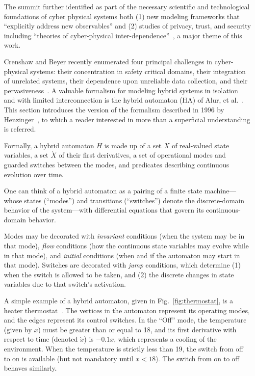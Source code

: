 The summit further identified as part of the necessary scientific and technological foundations of
cyber physical systems both (1) new modeling frameworks that ``explicitly address new observables'' and (2)
studies of privacy, trust, and security including ``theories of cyber-physical inter-dependence''~\cite{summitreport2008},
a major theme of this work.

Crenshaw and Beyer recently enumerated four principal challenges in 
cyber-physical systems:
their concentration in safety critical domains, their integration of 
unrelated systems, their dependence upon unreliable 
data collection, and their pervasiveness~\cite{crenshaw2010upbot}.
A valuable formalism for modeling hybrid systems in isolation and with limited 
interconnection is the hybrid automaton (HA) of Alur, et al.~\cite{alur1993hybrid}. 
This section introduces the version of the formalism described in 1996 by 
Henzinger~\cite{henzinger1996theory}, to which a reader interested in more 
than a superficial understanding is referred. 

Formally,
a hybrid automaton $H$ is made up of a set $X$ of real-valued state variables, 
a set $\dot{X}$ of their first derivatives, a set of operational modes and 
guarded switches between the modes, and predicates describing continuous 
evolution over time.

One can think of a hybrid automaton as a pairing of a finite state 
machine---whose states (``modes'') and transitions (``switches'') denote the 
discrete-domain behavior of the system---with differential equations that
govern its continuous-domain behavior.

Modes may be decorated with \emph{invariant} conditions (when the 
system may be in that mode), \emph{flow} conditions (how the 
continuous state variables may evolve while in that mode), and \emph{initial}
conditions (when and if the automaton may start in that mode). 
Switches are decorated with 
\emph{jump} conditions, which determine
(1) when the switch is allowed to be taken, and (2) the discrete changes 
in state variables due to that
switch's activation.

A simple example of a hybrid automaton, given in Fig.~\ref{fig:thermostat}, 
is a
heater thermostat~\cite{henzinger1996theory}. The vertices in the automaton represent 
its operating modes, and the edges represent its control
switches. In the ``Off'' mode, the temperature (given by $x$) must be greater 
than or equal to 18, and
its first derivative with respect to time (denoted $\dot{x}$) is $-0.1x$, which 
represents a cooling of
the environment. When the temperature is strictly less than 19, the switch from
off to on is available (but
not mandatory until $x < 18$). The switch from on to off behaves similarly.

